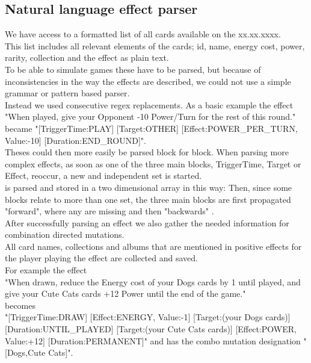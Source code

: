 \subsection{Natural language effect parser}
\label{sec:method:game:natlang_parser}
We have access to a formatted list of all cards available on the xx.xx.xxxx. \\
This list includes all relevant elements of the cards; id, name, energy cost, power, rarity, collection and the effect as plain text.\\
To be able to simulate games these have to be parsed, but because of inconsistencies in the way the effects are described, we could not use a simple grammar or pattern based parser.\\
Instead we used consecutive regex replacements. As a basic example the effect \\"When played, give your Opponent -10 Power/Turn for the rest of this round." \\became "[TriggerTime:PLAY] [Target:OTHER] [Effect:POWER\_PER\_TURN, Value:-10] [Duration:END\_ROUND]".\\
Theses could then more easily be parsed block for block. When parsing more complex effects, as soon as one of the three main blocks, TriggerTime, Target or Effect, reoccur, a new and independent set is started.\\
is parsed and stored in a two dimensional array in this way: Then, since some blocks relate to more than one set, the three main blocks are first propagated "forward", where any are missing and then "backwards" .\\
After successfully parsing an effect we also gather the needed information for combination directed mutations. \\
All card names, collections and albums that are mentioned in positive effects for the player playing the effect are collected and saved. \\
For example the effect \\"When drawn, reduce the Energy cost of your Dogs cards by 1 until played, and give your Cute Cats cards +12 Power until the end of the game." \\becomes
\\"[TriggerTime:DRAW] [Effect:ENERGY, Value:-1] [Target:(your Dogs cards)] [Duration:UNTIL\_PLAYED] [Target:(your Cute Cats cards)] [Effect:POWER, Value:+12] [Duration:PERMANENT]"
and has the combo mutation designation "[Dogs,Cute Cats]".\\
